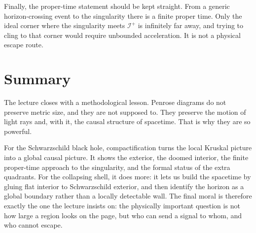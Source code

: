 Finally, the proper-time statement should be kept straight. From a generic horizon-crossing event to the singularity there is a finite proper time. Only the ideal corner where the singularity meets \(\mathscr I^+\) is infinitely far away, and trying to cling to that corner would require unbounded acceleration. It is not a physical escape route.

\section{Summary}

The lecture closes with a methodological lesson. Penrose diagrams do not preserve metric size, and they are not supposed to. They preserve the motion of light rays and, with it, the causal structure of spacetime. That is why they are so powerful.

For the Schwarzschild black hole, compactification turns the local Kruskal picture into a global causal picture. It shows the exterior, the doomed interior, the finite proper-time approach to the singularity, and the formal status of the extra quadrants. For the collapsing shell, it does more: it lets us build the spacetime by gluing flat interior to Schwarzschild exterior, and then identify the horizon as a global boundary rather than a locally detectable wall. The final moral is therefore exactly the one the lecture insists on: the physically important question is not how large a region looks on the page, but who can send a signal to whom, and who cannot escape.